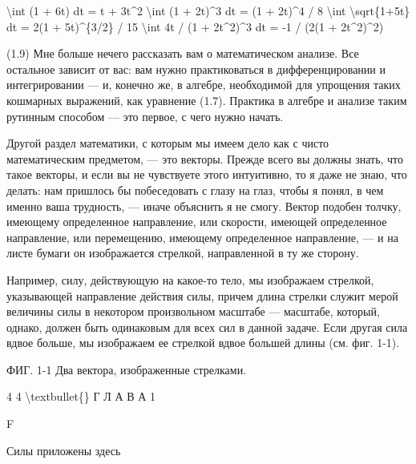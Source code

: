 \documentclass[10pt,oneside]{article}
\newcommand{\TipsRunning}[1]{\par\vspace{2bp}{\centering\footnotesize #1\par}\vspace{2bp}}
\newcommand{\TipsSubsection}[1]{\par\vspace{6bp}{\normalsize\bfseries #1\par}\vspace{2bp}}
\begin{document}
\textbackslash{}int (1 + 6t) dt = t + 3t\textasciicircum{}2 \textbackslash{}int (1 + 2t)\textasciicircum{}3 dt = (1 + 2t)\textasciicircum{}4 / 8 \textbackslash{}int \textbackslash{}sqrt\{1+5t\} dt = 2(1 + 5t)\textasciicircum{}\{3/2\} / 15 \textbackslash{}int 4t / (1 + 2t\textasciicircum{}2)\textasciicircum{}3 dt = -1 / (2(1 + 2t\textasciicircum{}2)\textasciicircum{}2)\par

\TipsRunning{П О Д Г О Т О В И Т Е Л Ь Н Ы Й  К У Р С \textbackslash{}textbullet\{\} 4 3}

(1.9) Мне больше нечего рассказать вам о математическом анализе. Все остальное зависит от вас: вам нужно практиковаться в дифференцировании и интегрировании --- и, конечно же, в алгебре, необходимой для упрощения таких кошмарных выражений, как уравнение (1.7). Практика в алгебре и анализе таким рутинным способом --- это первое, с чего нужно начать.\par

\TipsSubsection{1-6 Векторы}

Другой раздел математики, с которым мы имеем дело как с чисто математическим предметом, --- это векторы. Прежде всего вы должны знать, что такое векторы, и если вы не чувствуете этого интуитивно, то я даже не знаю, что делать: нам пришлось бы побеседовать с глазу на глаз, чтобы я понял, в чем именно ваша трудность, --- иначе объяснить я не смогу. Вектор подобен толчку, имеющему определенное направление, или скорости, имеющей определенное направление, или перемещению, имеющему определенное направление, --- и на листе бумаги он изображается стрелкой, направленной в ту же сторону.\par

Например, силу, действующую на какое-то тело, мы изображаем стрелкой, указывающей направление действия силы, причем длина стрелки служит мерой величины силы в некотором произвольном масштабе --- масштабе, который, однако, должен быть одинаковым для всех сил в данной задаче. Если другая сила вдвое больше, мы изображаем ее стрелкой вдвое большей длины (см. фиг. 1-1).\par

ФИГ. 1-1 Два вектора, изображенные стрелками.\par

4 4 \textbackslash{}textbullet\{\} Г Л А В А  1\par

F\par

Силы приложены здесь\par
\end{document}
